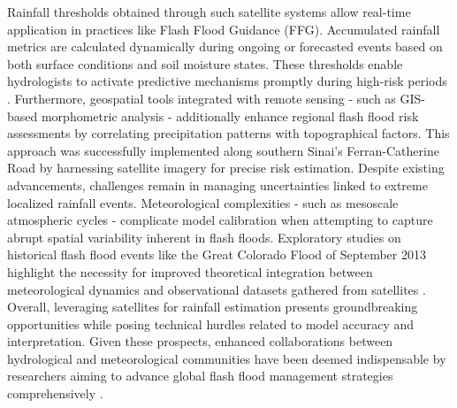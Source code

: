 Rainfall thresholds obtained through such satellite systems allow real-time application in practices like Flash Flood Guidance (FFG). Accumulated rainfall metrics are calculated dynamically during ongoing or forecasted events based on both surface conditions and soil moisture states. These thresholds enable hydrologists to activate predictive mechanisms promptly during high-risk periods \citep{Luong2021}.
Furthermore, geospatial tools integrated with remote sensing - such as GIS-based morphometric analysis - additionally enhance regional flash flood risk assessments by correlating precipitation patterns with topographical factors. This approach was successfully implemented along southern Sinai's Ferran-Catherine Road by harnessing satellite imagery for precise risk estimation.
Despite existing advancements, challenges remain in managing uncertainties linked to extreme localized rainfall events. Meteorological complexities - such as mesoscale atmospheric cycles - complicate model calibration when attempting to capture abrupt spatial variability inherent in flash floods. Exploratory studies on historical flash flood events like the Great Colorado Flood of September 2013 highlight the necessity for improved theoretical integration between meteorological dynamics and observational datasets gathered from satellites \citep{Yang2022}.
Overall, leveraging satellites for rainfall estimation presents groundbreaking opportunities while posing technical hurdles related to model accuracy and interpretation. Given these prospects, enhanced collaborations between hydrological and meteorological communities have been deemed indispensable by researchers aiming to advance global flash flood management strategies comprehensively \citep{Barthold2015}\citep{Khan2020}.

